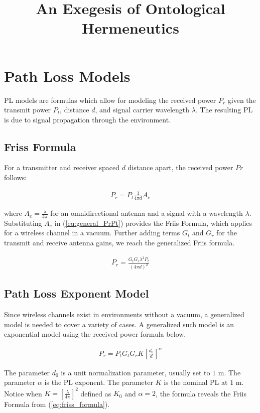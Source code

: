 \documentclass[12pt]{report} %
\begin{document}
\title{An Exegesis of Ontological Hermeneutics}

\tableofcontents
\chapter{Path Loss Models}

\gls{PL} models are formulas which allow for modeling the received
power $P_r$ given the transmit power $P_t$, distance $d$, and signal carrier
wavelength $\lambda$. The resulting \gls{PL} is due to signal propagation
through the environment.

\section{Friss Formula}
For a transmitter and receiver spaced $d$ distance apart, the received power
$Pr$ follows:

\begin{align}
  \label{eq:general_PrPt}
  P_r = P_t \frac{1}{4\pi d} A_e
\end{align}

where $A_e = \frac{\lambda}{4 \pi}$ for an omnidirectional antenna and a signal
with a wavelength $\lambda$. Substituting $A_e$ in (\ref{eq:general_PrPt})
provides the Friis Formula, which applies for a wireless channel in a vacuum.
Further adding terms $G_t$ and $G_r$ for the transmit and receive antenna gains,
we reach the generalized Friis formula.

\begin{align}
  \label{eq:friss_formula}
  P_r = \frac{G_t G_r \lambda ^2 P_t}{(4\pi d)^2}
\end{align}

\section{Path Loss Exponent Model}
Since wireless channels exist in environments without a vacuum, a generalized
model is needed to cover a variety of cases. A generalized such model is an
exponential model using the received power formula below.

\begin{align}
  \label{eq:general_exp_PL}
  P_r = P_t G_t G_r K \left[\frac{d_0}{d}\right]^\alpha
\end{align}

The parameter $d_0$ is a unit normalization parameter, usually set to $1$ m. The
parameter $\alpha$ is the \gls{PL} exponent. The parameter $K$ is the nominal
\gls{PL} at $1$ m. Notice when $K = [\frac{\lambda}{4 \pi}]^2$ defined as $K_0$
and $\alpha = 2$, the formula reveals the Friis Formula from
(\ref{eq:friss_formula}).
\end{document}

